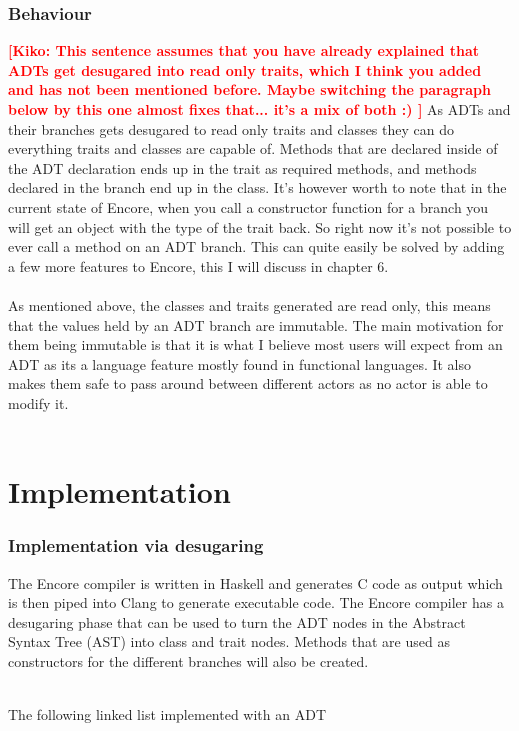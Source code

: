 \documentclass[10pt]{report}
\newcommand{\KIKO}[1]{\textcolor{red}{\textbf{[Kiko: #1]}}}
\begin{document}
\subsection{Behaviour}
\KIKO{This sentence assumes that you have already explained that ADTs get desugared into read only traits, which I think you added and has not been mentioned before. Maybe switching the paragraph below by this one almost fixes that... it's a mix of both :) }
As ADTs and their branches gets desugared to read only traits and classes they can do everything traits and classes are capable of.
Methods that are declared inside of the ADT declaration ends up in the trait as required methods, and methods declared in the branch end up in the class. It's however worth to note that in the current state of Encore, when you call a constructor function for a branch you will get an object with the type of the trait back. So right now it's not possible to ever call a method on an ADT branch. This can quite easily be solved by adding a few more features to Encore, this I will discuss in chapter 6.
\\\\As mentioned above, the classes and traits generated are read only, this means that the values held by an ADT branch are immutable.  The main motivation for them being immutable is that it is what I believe most users will expect from an ADT as its a language feature mostly found in functional languages. It also makes them safe to pass around between different actors as no actor is able to modify it.\\\\
\chapter{Implementation}

\subsection{Implementation via desugaring}
\par{\noindent The Encore compiler is written in Haskell and generates C code as output which is then piped into Clang to generate executable code. The Encore compiler has a desugaring phase that can be used to turn the ADT nodes in the Abstract Syntax Tree (AST) into class and trait nodes. Methods that are used as constructors for the different branches will also be created.\\\\}
\par{\noindent The following linked list implemented with an ADT}
\end{document}
